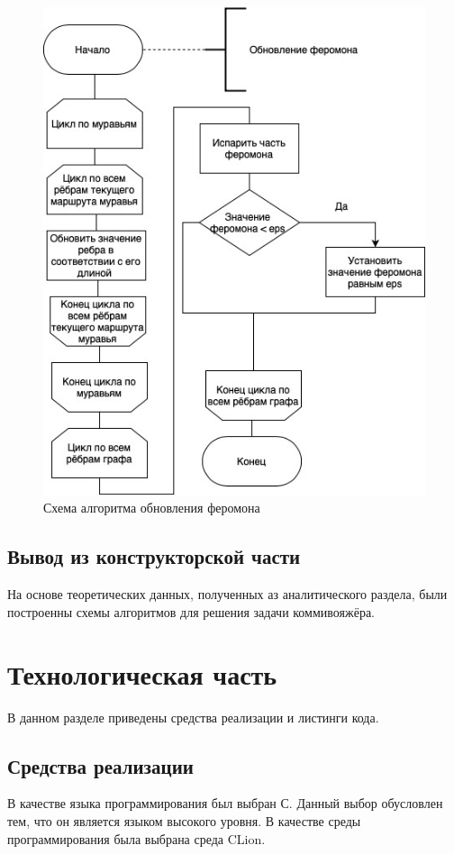 \documentclass[12pt]{report}
\begin{document}
\begin{figure}[H]
		\centering
		\includegraphics[scale=0.8]{dg.jpg}
		\caption{Схема алгоритма обновления феромона}
		\label{fig:ant}
\end{figure}
	
\section{Вывод из конструкторской части}
	
На основе теоретических данных, полученных аз аналитического раздела, были построенны схемы алгоритмов для решения задачи коммивояжёра.
	
\chapter{Технологическая часть}
	
В данном разделе приведены средства реализации и листинги кода.
	
\section{Средства реализации}
	В качестве языка программирования был выбран С. Данный выбор обусловлен тем, что он является языком высокого уровня. В качестве среды программирования была выбрана среда CLion. 
	
\end{document}
